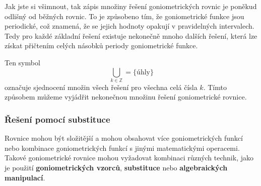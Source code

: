 \documentclass[12pt,a4paper]{article}
\begin{document}
Jak jste si všimnout, tak zápis množiny řešení goniometrických rovnic je poněkud odlišný
od běžných rovnic. To je způsobeno tím, že goniometrické funkce jsou periodické,
což znamená, že se jejich hodnoty opakují v pravidelných intervalech.
Tedy pro každé základní řešení existuje nekonečně mnoho dalších řešení,
která lze získat přičtením celých násobků periody goniometrické funkce.

Ten symbol
\[
    \bigcup_{k \in \mathbb{Z}} = \{\text{úhly}\}
\] 
označuje sjednocení množin všech řešení
pro všechna celá čísla $k$. Tímto způsobem můžeme vyjádřit nekonečnou množinu řešení goniometrické rovnice.

\subsubsection*{Řešení pomocí substituce}
Rovnice mohou být složitější a mohou obsahovat více goniometrických funkcí
nebo kombinace goniometrických funkcí s jinými matematickými operacemi.
Takové goniometrické rovnice mohou vyžadovat kombinaci různých technik,
jako je použití \textbf{goniometrických vzorců}, \textbf{substituce} nebo \textbf{algebraických manipulací}.
\end{document}

